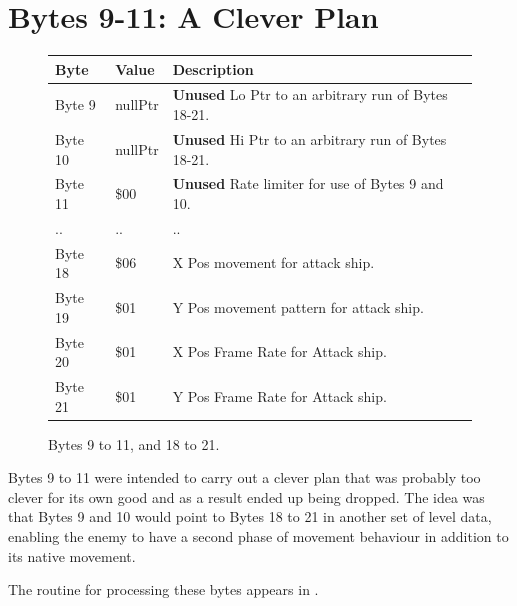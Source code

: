 \section{Bytes 9-11: A Clever Plan}
\begin{figure}[H]

  {
    \setlength{\tabcolsep}{3.0pt}
    \setlength\cmidrulewidth{\heavyrulewidth} %
    \begin{adjustbox}{width=10cm}

      \begin{tabular}{lll}
        \toprule
        Byte    & Value                     & Description                                                        \\
        \midrule
        Byte 9  & nullPtr                   & \textbf{Unused} Lo Ptr to an arbitrary run of Bytes 18-21.\\
        Byte 10 & nullPtr                   & \textbf{Unused} Hi Ptr to an arbitrary run of Bytes 18-21.\\
        Byte 11 & \$00                       & \textbf{Unused} Rate limiter for use of Bytes 9 and 10. \\
        .. & ..                       & ..\\
        Byte 18 & \$06                       & X Pos movement for attack ship.                                    \\
        Byte 19 & \$01                       & Y Pos movement pattern for attack ship.                            \\
        Byte 20 & \$01                       & X Pos Frame Rate for Attack ship.                                  \\
        Byte 21 & \$01                       & Y Pos Frame Rate for Attack ship.                                  \\
        \bottomrule
      \end{tabular}
    \end{adjustbox}
  }\caption{Bytes 9 to 11, and 18 to 21.}
\end{figure}
Bytes 9 to 11 were intended to carry out a clever plan that was probably too clever for its own
good and as a result ended up being dropped. The idea was that Bytes 9 and 10 would point to 
Bytes 18 to 21 in another set of level data, enabling the enemy to have a second phase of movement
behaviour in addition to its native movement.

The routine for processing these bytes appears in . 

